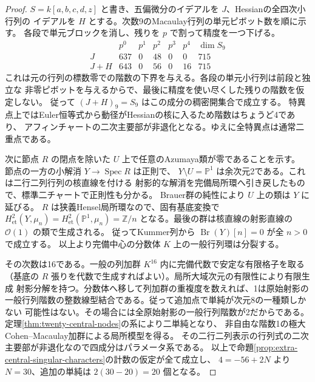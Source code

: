 \begin{proof}
$S=k[a,b,c,d,z]$ と書き、五偏微分のイデアルを $J$、Hessianの全四次小行列の
イデアルを $H$ とする。次数9のMacaulay行列の単元ピボット数を順に示す。
各段で単元ブロックを消し、残りを $p$ で割って精度を一つ下げる。
\[
\begin{array}{c|rrrrr|r}
 &p^0&p^1&p^2&p^3&p^4&\dim S_9\\\hline
 J&637&0&48&0&0&715\\
 J+H&643&0&56&0&16&715
\end{array}
\]
これは元の行列の標数零での階数の下界を与える。各段の単元小行列は前段と独立な
非零ピボットを与えるからで、最後に精度を使い尽くした残りの階数を仮定しない。
従って $(J+H)_9=S_9$ はこの成分の稠密開集合で成立する。
特異点上ではEuler恒等式から動径がHessianの核に入るため階数はちょうど4であり、
アフィンチャートの二次主要部が非退化となる。ゆえに全特異点は通常二重点である。

次に節点 $R$ の閉点を除いた $U$ 上で任意のAzumaya類が零であることを示す。
節点の一方の小解消 $Y\to\operatorname{Spec}R$ は正則で、
$Y\setminus U=\mathbb P^1$ は余次元2である。これは二行二列行列の核直線を付ける
射影的な解消を完備局所環へ引き戻したもので、標準二チャートで正則性も分かる。
Brauer群の純性により $U$ 上の類は $Y$ に延びる。
$R$ は狭義Hensel局所環なので、固有基底変換で
$H^2_{\mathrm{et}}(Y,\mu_n)=H^2_{\mathrm{et}}(\mathbb P^1,\mu_n)=\mathbb Z/n$
となる。最後の群は核直線の射影直線の $\mathcal O(1)$ の類で生成される。
従ってKummer列から $\operatorname{Br}(Y)[n]=0$ が全 $n>0$ で成立する。
以上より完備中心の分数体 $K$ 上の一般行列環は分裂する。

その次数は16である。一般の列加群 $K^{16}$ 内に完備代数で安定な有限格子を取る
（基底の $R$ 張りを代数で生成すればよい）。局所大域次元の有限性により有限生成
射影分解を持つ。分数体へ移して列加群の重複度を数えれば、1は原始射影の
一般行列階数の整数線型結合である。従って追加点で単純が次元8の一種類しかない
可能性はない。その場合には全原始射影の一般行列階数が2だからである。
定理\ref{thm:twenty-central-nodes}の系により二単純となり、
非自由な階数1の極大Cohen--Macaulay加群による局所模型を得る。
その二行二列表示の行列式の二次主要部が非退化なので四成分はパラメータ系である。
以上で命題\ref{prop:extra-central-singular-characters}の計数の仮定が全て成立し、
$4=-56+2N$ より $N=30$、追加の単純は $2(30-20)=20$ 個となる。
\end{proof}

